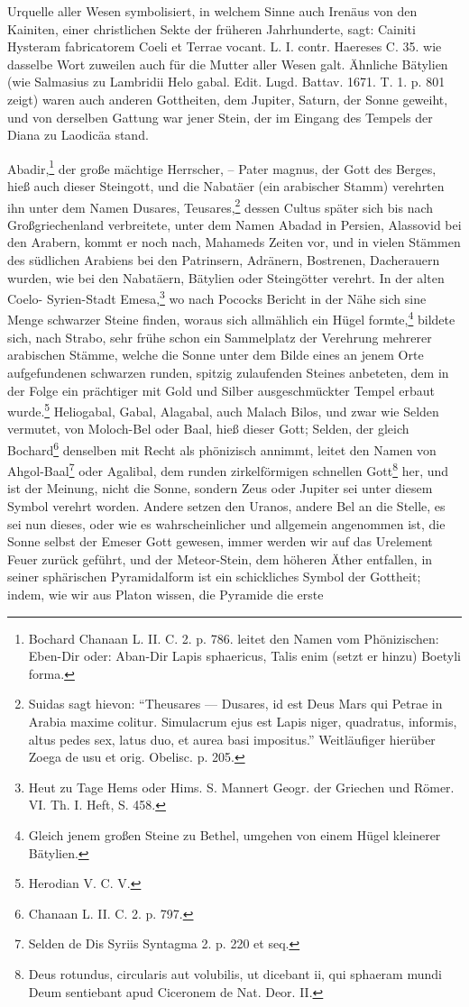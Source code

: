\documentclass[a4paper, 11pt, oneside, polutonikogreek, german]{article}
\begin{document}
Urquelle aller Wesen symbolisiert, in welchem Sinne auch Irenäus von den Kainiten, einer christlichen Sekte der früheren Jahrhunderte, sagt: Cainiti Hysteram fabricatorem Coeli et Terrae vocant. L. I. contr. Haereses C. 35. wie dasselbe Wort zuweilen auch für die Mutter aller Wesen galt. Ähnliche Bätylien (wie Salmasius zu Lambridii Helo gabal. Edit. Lugd. Battav. 1671. T. 1. p. 801 zeigt) waren auch anderen Gottheiten, dem Jupiter, Saturn, der Sonne geweiht, und von derselben Gattung war jener Stein, der im Eingang des Tempels der Diana zu Laodicäa stand.

Abadir,\footnote{Bochard Chanaan L. II. C. 2. p. 786. leitet den Namen vom Phönizischen: Eben-Dir oder: Aban-Dir Lapis sphaericus, Talis enim (setzt er hinzu) Boetyli forma.} der große mächtige Herrscher, -- Pater magnus, der Gott des Berges, hieß auch dieser Steingott, und die Nabatäer (ein arabischer Stamm) verehrten ihn unter dem Namen Dusares, Teusares,\footnote{Suidas sagt hievon: "`Theusares --- Dusares, id est Deus Mars qui Petrae in Arabia maxime colitur. Simulacrum ejus est Lapis niger, quadratus, informis, altus pedes sex, latus duo, et aurea basi impositus."' Weitläufiger hierüber Zoega de usu et orig. Obelisc. p. 205.} dessen Cultus später sich bis nach Großgriechenland verbreitete, unter dem Namen Abadad in Persien, Alassovid bei den Arabern, kommt er noch nach, Mahameds Zeiten vor, und in vielen Stämmen des südlichen Arabiens bei den Patrinsern, Adränern, Bostrenen, Dacherauern wurden, wie bei den Nabatäern, Bätylien oder Steingötter verehrt. In der alten Coelo- Syrien-Stadt Emesa,\footnote{Heut zu Tage Hems oder Hims. S. Mannert Geogr. der Griechen und Römer. VI. Th. I. Heft, S. 458.} wo nach Pococks Bericht in der Nähe sich sine Menge schwarzer Steine finden, woraus sich allmählich ein Hügel formte,\footnote{Gleich jenem großen Steine zu Bethel, umgehen von einem Hügel kleinerer Bätylien.} bildete sich, nach Strabo, sehr frühe schon ein Sammelplatz der Verehrung mehrerer arabischen Stämme, welche die Sonne unter dem Bilde eines an jenem Orte aufgefundenen schwarzen runden, spitzig zulaufenden Steines anbeteten, dem in der Folge ein prächtiger mit Gold und Silber ausgeschmückter Tempel erbaut wurde.\footnote{Herodian V. C. V.} Heliogabal, Gabal, Alagabal, auch Malach Bilos, und zwar wie Selden vermutet, von Moloch-Bel oder Baal, hieß dieser Gott; Selden, der gleich Bochard\footnote{Chanaan L. II. C. 2. p. 797.} denselben mit Recht als phönizisch annimmt, leitet den Namen von Ahgol-Baal\footnote{Selden de Dis Syriis Syntagma 2. p. 220 et seq.} oder Agalibal, dem runden zirkelförmigen schnellen Gott\footnote{Deus rotundus, circularis aut volubilis, ut dicebant ii, qui sphaeram mundi Deum sentiebant apud Ciceronem de Nat. Deor. II.} her, und ist der Meinung, nicht die Sonne, sondern Zeus oder Jupiter sei unter diesem Symbol verehrt worden. Andere setzen den Uranos, andere Bel an die Stelle, es sei nun dieses, oder wie es wahrscheinlicher und allgemein angenommen ist, die Sonne selbst der Emeser Gott gewesen, immer werden wir auf das Urelement Feuer zurück geführt, und der Meteor-Stein, dem höheren Äther entfallen, in seiner sphärischen Pyramidalform ist ein schickliches Symbol der Gottheit; indem, wie wir aus Platon wissen, die Pyramide die erste 
\end{document}
